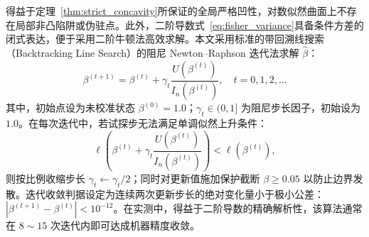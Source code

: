 得益于定理~\ref{thm:strict_concavity}所保证的全局严格凹性，对数似然曲面上不存在局部非凸陷阱或伪驻点。此外，二阶导数式~\eqref{eq:fisher_variance}具备条件方差的闭式表达，便于采用二阶牛顿法高效求解。本文采用标准的带回溯线搜索（Backtracking Line Search）的阻尼 Newton--Raphson 迭代法求解 $\hat\beta$：
\begin{equation}\label{eq:newton_iteration}
\beta^{(t+1)} = \beta^{(t)} + \gamma_t \frac{U(\beta^{(t)})}{I_n(\beta^{(t)})}, \quad t = 0, 1, 2, \dots
\end{equation}
其中，初始点设为未校准状态 $\beta^{(0)} = 1.0$；$\gamma_t \in (0, 1]$ 为阻尼步长因子，初始设为 $1.0$。在每次迭代中，若试探步无法满足单调似然上升条件：
\begin{equation}\label{eq:armijo}
\ell\left(\beta^{(t)} + \gamma_t \frac{U(\beta^{(t)})}{I_n(\beta^{(t)})}\right) < \ell\left(\beta^{(t)}\right),
\end{equation}
则按比例收缩步长 $\gamma_t \leftarrow \gamma_t / 2$；同时对更新值施加保护截断 $\beta \ge 0.05$ 以防止边界发散。迭代收敛判据设定为连续两次更新步长的绝对变化量小于极小公差：$|\beta^{(t+1)} - \beta^{(t)}| < 10^{-12}$。在实测中，得益于二阶导数的精确解析性，该算法通常在 $8 \sim 15$ 次迭代内即可达成机器精度收敛。
